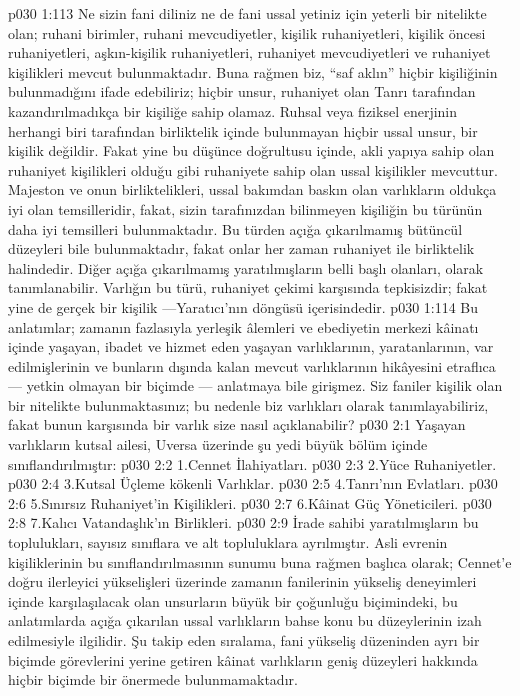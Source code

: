 \vs p030 1:113 Ne sizin fani diliniz ne de fani ussal yetiniz için yeterli bir nitelikte olan; ruhani birimler, ruhani mevcudiyetler, kişilik ruhaniyetleri, kişilik öncesi ruhaniyetleri, aşkın\hyp{}kişilik ruhaniyetleri, ruhaniyet mevcudiyetleri ve ruhaniyet kişilikleri mevcut bulunmaktadır. Buna rağmen biz, “saf aklın” hiçbir kişiliğinin bulunmadığını ifade edebiliriz; hiçbir unsur, ruhaniyet olan Tanrı tarafından kazandırılmadıkça bir kişiliğe sahip olamaz. Ruhsal veya fiziksel enerjinin herhangi biri tarafından birliktelik içinde bulunmayan hiçbir ussal unsur, bir kişilik değildir. Fakat yine bu düşünce doğrultusu içinde, akli yapıya sahip olan ruhaniyet kişilikleri olduğu gibi ruhaniyete sahip olan ussal kişilikler mevcuttur. Majeston ve onun birliktelikleri, ussal bakımdan baskın olan varlıkların oldukça iyi olan temsilleridir, fakat, sizin tarafınızdan bilinmeyen kişiliğin bu türünün daha iyi temsilleri bulunmaktadır. Bu türden  açığa çıkarılmamış bütüncül düzeyleri bile bulunmaktadır, fakat onlar her zaman ruhaniyet ile birliktelik halindedir. Diğer açığa çıkarılmamış yaratılmışların belli başlı olanları,  olarak tanımlanabilir. Varlığın bu türü, ruhaniyet çekimi karşısında tepkisizdir; fakat yine de gerçek bir kişilik ---Yaratıcı’nın döngüsü içerisindedir.
\vs p030 1:114 Bu anlatımlar; zamanın fazlasıyla yerleşik âlemleri ve ebediyetin merkezi kâinatı içinde yaşayan, ibadet ve hizmet eden yaşayan varlıklarının, yaratanlarının, var edilmişlerinin ve bunların dışında kalan mevcut varlıklarının hikâyesini etraflıca --- yetkin olmayan bir biçimde --- anlatmaya bile girişmez. Siz faniler kişilik olan bir nitelikte bulunmaktasınız; bu nedenle biz varlıkları  olarak tanımlayabiliriz, fakat bunun karşısında bir  varlık size nasıl açıklanabilir?
\vs p030 2:1 Yaşayan varlıkların kutsal ailesi, Uversa üzerinde şu yedi büyük bölüm içinde sınıflandırılmıştır:
\vs p030 2:2 1.\bibnobreakspace Cennet İlahiyatları.
\vs p030 2:3 2.\bibnobreakspace Yüce Ruhaniyetler.
\vs p030 2:4 3.\bibnobreakspace Kutsal Üçleme kökenli Varlıklar.
\vs p030 2:5 4.\bibnobreakspace Tanrı’nın Evlatları.
\vs p030 2:6 5.\bibnobreakspace Sınırsız Ruhaniyet’in Kişilikleri.
\vs p030 2:7 6.\bibnobreakspace Kâinat Güç Yöneticileri.
\vs p030 2:8 7.\bibnobreakspace Kalıcı Vatandaşlık’ın Birlikleri.
\vs p030 2:9 İrade sahibi yaratılmışların bu toplulukları, sayısız sınıflara ve alt topluluklara ayrılmıştır. Asli evrenin kişiliklerinin bu sınıflandırılmasının sunumu buna rağmen başlıca olarak; Cennet’e doğru ilerleyici yükselişleri üzerinde zamanın fanilerinin yükseliş deneyimleri içinde karşılaşılacak olan unsurların büyük bir çoğunluğu biçimindeki, bu anlatımlarda açığa çıkarılan ussal varlıkların bahse konu bu düzeylerinin izah edilmesiyle ilgilidir. Şu takip eden sıralama, fani yükseliş düzeninden ayrı bir biçimde görevlerini yerine getiren kâinat varlıkların geniş düzeyleri hakkında hiçbir biçimde bir önermede bulunmamaktadır.
